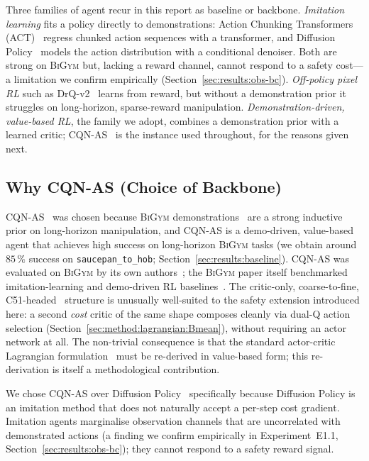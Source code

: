 \documentclass[11pt,a4paper]{report}
\newcommand{\bigym}{\textsc{BiGym}}
\newcommand{\cqnas}{CQN-AS}
\begin{document}
Three families of agent recur in this report as baseline or backbone.
\emph{Imitation learning} fits a policy directly to demonstrations:
Action Chunking Transformers (ACT)~\cite{zhao2023act} regress chunked
action sequences with a transformer, and Diffusion
Policy~\cite{chi2023diffusion} models the action distribution with a
conditional denoiser. Both are strong on \bigym{} but, lacking a reward
channel, cannot respond to a safety cost---a limitation we confirm
empirically (Section~\ref{sec:results:obs-bc}). \emph{Off-policy pixel
RL} such as DrQ-v2~\cite{yarats2021drqv2} learns from reward, but without
a demonstration prior it struggles on long-horizon, sparse-reward
manipulation. \emph{Demonstration-driven, value-based RL}, the family we
adopt, combines a demonstration prior with a learned critic;
\cqnas{}~\cite{seo2024cqnas} is the instance used throughout, for the
reasons given next.

\subsection{Why \cqnas{} (Choice of Backbone)}
\label{sec:bg:rl:cqnas}

\cqnas{}~\cite{seo2024cqnas} was chosen because \bigym{}
demonstrations~\cite{chernyadev2024bigym} are a strong inductive
prior on long-horizon manipulation, and \cqnas{} is a demo-driven,
value-based agent that achieves high success on long-horizon
\bigym{} tasks (we obtain around $85\,\%$ success on
\texttt{saucepan\_to\_hob}; Section~\ref{sec:results:baseline}).
\cqnas{} was evaluated on \bigym{} by its own
authors~\cite{seo2024cqnas}; the \bigym{} paper itself benchmarked
imitation-learning and demo-driven RL baselines~\cite{chernyadev2024bigym}.
The critic-only, coarse-to-fine,
C51-headed~\cite{bellemare2017c51} structure is unusually
well-suited to the safety extension introduced here: a second
\emph{cost} critic of the same shape composes cleanly via dual-Q
action selection (Section~\ref{sec:method:lagrangian:Bmean}),
without requiring an actor network at all. The non-trivial
consequence is that the standard actor-critic Lagrangian
formulation~\cite{ray2019safetygym,stooke2020pid} must be re-derived
in value-based form; this re-derivation is itself a methodological
contribution.

We chose \cqnas{} over Diffusion Policy~\cite{chi2023diffusion}
specifically because Diffusion Policy is an imitation method that
does not naturally accept a per-step cost gradient. Imitation
agents marginalise observation channels that are uncorrelated with
demonstrated actions (a finding we confirm empirically in
Experiment~E1.1, Section~\ref{sec:results:obs-bc}); they cannot
respond to a safety reward signal.
\end{document}
